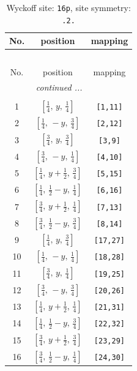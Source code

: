 \documentclass[fleqn,8pt]{jsarticle}
\begin{document}
\renewcommand{\arraystretch}{1.2}
\begin{longtable}{ccc}
\caption{Wyckoff site: {\tt 16p}, site symmetry: {\tt .2.}}
 \\
 \hline \hline
No. & position & mapping \\ \hline \endfirsthead

\multicolumn{2}{l}{\tablename\ \thetable{}} \\
 \hline \hline
No. & position & mapping \\ \hline \endhead

 \hline \hline
\multicolumn{2}{r}{\footnotesize\it continued ...} \\ \endfoot

 \hline \hline
\multicolumn{2}{r}{} \\ \endlastfoot

1 & $\left[ \frac{1}{4},\, y,\, \frac{1}{4} \right]$ & {\tt [1,11]} \\ \hline
2 & $\left[ \frac{1}{4},\, - y,\, \frac{3}{4} \right]$ & {\tt [2,12]} \\ \hline
3 & $\left[ \frac{3}{4},\, y,\, \frac{3}{4} \right]$ & {\tt [3,9]} \\ \hline
4 & $\left[ \frac{3}{4},\, - y,\, \frac{1}{4} \right]$ & {\tt [4,10]} \\ \hline
5 & $\left[ \frac{1}{4},\, y + \frac{1}{2},\, \frac{3}{4} \right]$ & {\tt [5,15]} \\ \hline
6 & $\left[ \frac{1}{4},\, \frac{1}{2} - y,\, \frac{1}{4} \right]$ & {\tt [6,16]} \\ \hline
7 & $\left[ \frac{3}{4},\, y + \frac{1}{2},\, \frac{1}{4} \right]$ & {\tt [7,13]} \\ \hline
8 & $\left[ \frac{3}{4},\, \frac{1}{2} - y,\, \frac{3}{4} \right]$ & {\tt [8,14]} \\ \hline
9 & $\left[ \frac{1}{4},\, y,\, \frac{3}{4} \right]$ & {\tt [17,27]} \\ \hline
10 & $\left[ \frac{1}{4},\, - y,\, \frac{1}{4} \right]$ & {\tt [18,28]} \\ \hline
11 & $\left[ \frac{3}{4},\, y,\, \frac{1}{4} \right]$ & {\tt [19,25]} \\ \hline
12 & $\left[ \frac{3}{4},\, - y,\, \frac{3}{4} \right]$ & {\tt [20,26]} \\ \hline
13 & $\left[ \frac{1}{4},\, y + \frac{1}{2},\, \frac{1}{4} \right]$ & {\tt [21,31]} \\ \hline
14 & $\left[ \frac{1}{4},\, \frac{1}{2} - y,\, \frac{3}{4} \right]$ & {\tt [22,32]} \\ \hline
15 & $\left[ \frac{3}{4},\, y + \frac{1}{2},\, \frac{3}{4} \right]$ & {\tt [23,29]} \\ \hline
16 & $\left[ \frac{3}{4},\, \frac{1}{2} - y,\, \frac{1}{4} \right]$ & {\tt [24,30]} \\
\end{longtable}
\end{document}
